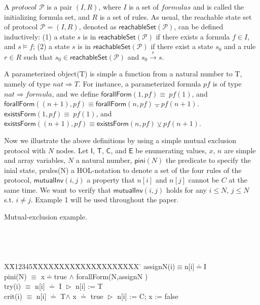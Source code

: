 \documentclass[conference]{IEEEtran}
\newlength{\fminilength}
\newenvironment{fmini}[1][\linewidth]
  {\setlength{\fminilength}{#1\fboxsep-2\fboxrule}%
   \vspace{2ex}\noindent\begin{lrbox}{\fminibox}\begin{minipage}{\fminilength}%
   \mbox{ }\hfill\vspace{-2.5ex}}%
  {\end{minipage}\end{lrbox}\vspace{1ex}\hspace{0ex}%
   \framebox{\usebox{\fminibox}}}
\newenvironment{specification}
{\noindent\scriptsize
\tt\begin{fmini}\begin{tabbing}X\=X12345\=XXXX\=XXXX\=XXXX\=XXXX\=XXXX
\=\+\kill} {\end{tabbing}\normalfont\end{fmini}}
\def \eqc {\doteq }
\def \andc {\barwedge }
\def \orc {\veebar }
\begin{document}
{A $protocol$ $\mathcal{P}$ is a pair $(I,R)$, where $I$ is a set of $formulas$ and is called the initializing formula  set, and $R$ is a set of rules. %
 As usual, the reachable state set of protocol  $\mathcal{P}=(I,R)$, denoted as $\mathsf{reachableSet}(\mathcal{P})$, can be defined inductively: (1) a state $s$ is in
$\mathsf{reachableSet}(\mathcal{P})$ if there exists a formula $f \in I$, and $s \models  f$; (2) a state $s$ is in
$\mathsf{reachableSet}(\mathcal{P})$ if there exist a  state $s_0$  and a rule $r \in R$ such that $s_0 \in \mathsf{reachableSet}(\mathcal{P})$ and $s_0\overset{r}{\rightarrow } s$.

A parameterized object(T) is simple a function from a natural number to T, namely of type $nat \Rightarrow T$. For instance, a parameterized formula $pf$ is of type $nat \Rightarrow formula$, and we define
$\mathsf{forallForm}(1,pf)\equiv~pf(1)$, and $\mathsf{forallForm}((n+1),pf)\equiv\mathsf{forallForm}(n,pf) \andc pf(n +1)$. $\mathsf{existsForm}(1,pf)\equiv~pf(1)$, and $\mathsf{existsForm}((n+1),pf)\equiv\mathsf{existsForm}(n,pf) \orc pf(n +1)$.





Now we illustrate the above definitions by using a simple mutual exclusion protocol with $N$ nodes. Let $\mathsf{I}$, $\mathsf{T}$,
 $\mathsf{C}$, and  $\mathsf{E}$  be   enumerating values, $x$,    $n$ are  simple and array variables, $N$ a natural number,  $\mathsf{pini}(N)$   the predicate to specify the inial state, prules(N) a HOL-notation to denote a set of the four rules of the protocol, $\mathsf{mutualInv}(i,j)$ a property that $n[i]$ and $ n[j]$ cannot be $C$ at the same time. We want to verify that $\mathsf{mutualInv}(i,j)$ holds for any $i\le N$, $j \le N$ s.t. $i \neq j$. Example 1 will be used throughout the paper.
\vspace{-5pt}
\begin{example}\label{example1}Mutual-exclusion example.

\begin{specification}
assignN(i)$\equiv$n[i]$\eqc$I\\
 pini(N) $\equiv$
   x$\eqc$true $\wedge$  forallForm(N,assignN )\\

    try(i) $\equiv$ n[i] $\eqc$ I $\vartriangleright$ n[i] := T \\

    crit(i) $\equiv$ n[i] $\eqc$ T$\wedge$ x $\eqc$ true $\vartriangleright$  n[i] := C; x := false\\


\end{specification}
\end{example}}
\end{document}
